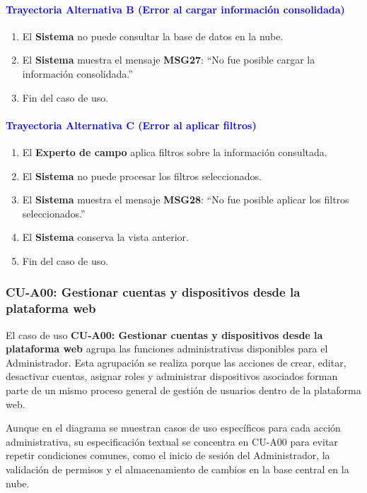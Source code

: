 \paragraph{\textbf{\textcolor{blue}{Trayectoria Alternativa B (Error al cargar información consolidada)}}}
\begin{enumerate}
    \item El \textbf{Sistema} no puede consultar la base de datos en la nube.
    \item El \textbf{Sistema} muestra el mensaje \textbf{MSG27}: ``No fue posible cargar la información consolidada.''
    \item Fin del caso de uso.
\end{enumerate}

\paragraph{\textbf{\textcolor{blue}{Trayectoria Alternativa C (Error al aplicar filtros)}}}
\begin{enumerate}
    \item El \textbf{Experto de campo} aplica filtros sobre la información consultada.
    \item El \textbf{Sistema} no puede procesar los filtros seleccionados.
    \item El \textbf{Sistema} muestra el mensaje \textbf{MSG28}: ``No fue posible aplicar los filtros seleccionados.''
    \item El \textbf{Sistema} conserva la vista anterior.
    \item Fin del caso de uso.
\end{enumerate}

\newpage
\subsubsection{CU-A00: Gestionar cuentas y dispositivos desde la plataforma web}

El caso de uso \textbf{CU-A00: Gestionar cuentas y dispositivos desde la plataforma web} agrupa las funciones administrativas disponibles para el Administrador. Esta agrupación se realiza porque las acciones de crear, editar, desactivar cuentas, asignar roles y administrar dispositivos asociados forman parte de un mismo proceso general de gestión de usuarios dentro de la plataforma web.

Aunque en el diagrama se muestran casos de uso específicos para cada acción administrativa, su especificación textual se concentra en CU-A00 para evitar repetir condiciones comunes, como el inicio de sesión del Administrador, la validación de permisos y el almacenamiento de cambios en la base central en la nube.

